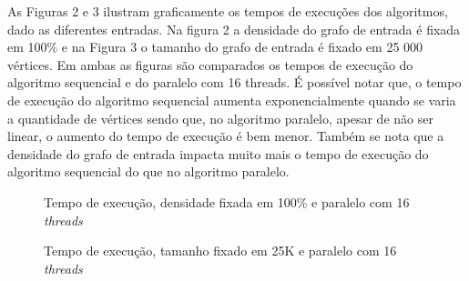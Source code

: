 \documentclass[12pt]{article}
\begin{document}
As Figuras 2 e 3 ilustram graficamente os tempos de execuções dos algoritmos, dado as diferentes entradas. Na figura 2 a densidade do grafo de entrada é fixada em 100\% e na Figura 3 o tamanho do grafo de entrada é fixado em 25 000 vértices. Em ambas as figuras são comparados os tempos de execução do algoritmo sequencial e do paralelo com 16 threads. É possível notar que, o tempo de execução do algoritmo sequencial aumenta exponencialmente quando se varia a quantidade de vértices sendo que, no algoritmo paralelo, apesar de não ser linear, o aumento do tempo de execução é bem menor. Também se nota que a densidade do grafo de entrada impacta muito mais o tempo de execução do algoritmo sequencial do que no algoritmo paralelo.

\begin{figure}[htp!]
    \centering
    \begin{minipage}{.48\textwidth}
        \centering
        \resizebox{\textwidth}{!}
        {
		}
        \caption{Tempo de execução, densidade fixada em 100\% e paralelo com 16 \emph{threads}}
    \end{minipage}\hfill%
    \begin{minipage}{.48\textwidth}
        \centering
        \resizebox{\textwidth}{!}
        {
		}
        \caption{Tempo de execução, tamanho fixado em 25K e paralelo com 16 \emph{threads}}
    \end{minipage}
\end{figure}
\end{document}
